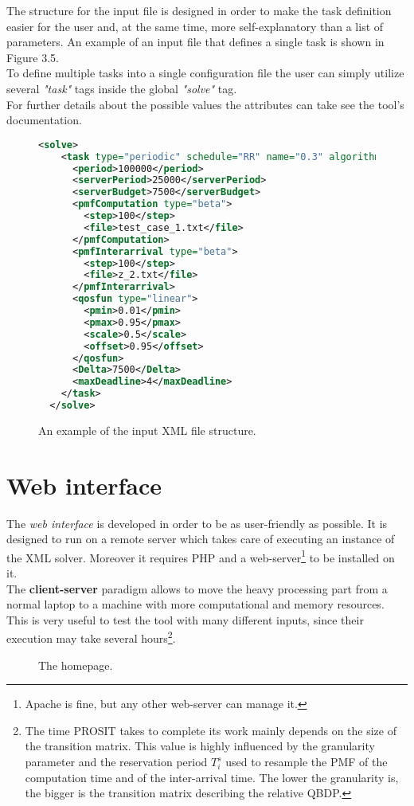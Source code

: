 The structure for the input file is designed in order to make the task definition easier for the user and, at the same time, more self-explanatory than a list of parameters. An example of an input file that defines a single task is shown in Figure 3.5.\\
To define multiple tasks into a single configuration file the user can simply utilize several \emph{"task"} tags inside the global \emph{"solve"} tag.\\ 
For further details about the possible values the attributes can take see the tool's documentation.  
\begin{figure}[H]
\begin{lstlisting}[frame=bt, language=XML, numbers=none]
  <solve>
    <task type="periodic" schedule="RR" name="0.3" algorithm="cyclic">
      <period>100000</period>
      <serverPeriod>25000</serverPeriod>
      <serverBudget>7500</serverBudget>
      <pmfComputation type="beta">
        <step>100</step>
        <file>test_case_1.txt</file>
      </pmfComputation>
      <pmfInterarrival type="beta">
        <step>100</step>
        <file>z_2.txt</file>
      </pmfInterarrival>
      <qosfun type="linear">
        <pmin>0.01</pmin>
        <pmax>0.95</pmax>
        <scale>0.5</scale>
        <offset>0.95</offset>
      </qosfun>
      <Delta>7500</Delta>
      <maxDeadline>4</maxDeadline>
    </task>
  </solve>
\end{lstlisting}
\caption{An example of the input XML file structure.}
\end{figure}

\section{Web interface}
The \emph{web interface} is developed in order to be as user-friendly as possible. It is designed to run on a remote server which takes care of executing an instance of the XML solver. Moreover it requires PHP and a web-server\footnote{Apache is fine, but any other web-server can manage it.} to be installed on it.\\
The \textbf{client-server} paradigm allows to move the heavy processing part from a normal laptop to a machine with more computational and memory resources. This is very useful to test the tool with many different inputs, since their execution may take several hours\footnote{The time PROSIT takes to complete its work mainly depends on the size of the transition matrix. This value is highly influenced by the granularity parameter and the reservation period \( T_{i}^{s} \) used to resample the PMF of the computation time and of the inter-arrival time. The lower the granularity is, the bigger is the transition matrix describing the relative QBDP.}.
\begin{figure}[H]
  \caption{The homepage.}
  \label{index}
\end{figure}

